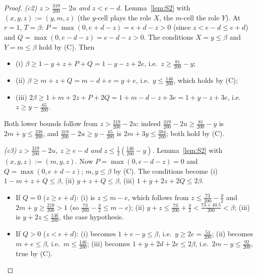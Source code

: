 \documentclass[11pt]{amsart}
\theoremstyle{definition}
\theoremstyle{remark}
\begin{document}
\begin{proof}
\emph{(c2) $z>\tfrac{319}{200}-2u$ and $z<e-d$.} Lemma~\ref{lem:S2} with $(x,y,z):=(y,m,z)$ (the $y$-cell plays the role $X$, the $m$-cell the role $Y$). At $r=1$, $T=\beta$: $P=\max(0,e+d-z)=e+d-z>0$ (since $z<e-d\le e+d$) and $Q=\max(0,e-d-z)=e-d-z>0$. The conditions $X=y\le\beta$ and $Y=m\le\beta$ hold by (C). Then
\begin{itemize}
\item (i) $\beta\ge1-y+z+P+Q=1-y-z+2e$, i.e.\ $z\ge\tfrac{81}{200}-y$;
\item (ii) $\beta\ge m+z+Q=m-d+e=y+e$, i.e.\ $y\le\tfrac{146}{200}$, which holds by (C);
\item (iii) $2\beta\ge1+m+2z+P+2Q=1+m-d-z+3e=1+y-z+3e$, i.e.\ $z\ge y-\tfrac{65}{200}$.
\end{itemize}
Both lower bounds follow from $z>\tfrac{319}{200}-2u$: indeed $\tfrac{319}{200}-2u\ge\tfrac{81}{200}-y$ is $2m+y\le\tfrac{238}{200}$, and $\tfrac{319}{200}-2u\ge y-\tfrac{65}{200}$ is $2m+3y\le\tfrac{384}{200}$; both hold by (C).

\emph{(c3) $z>\tfrac{319}{200}-2u$, $z\ge e-d$ and $z\le\tfrac12(\tfrac{146}{200}-y)$.} Lemma~\ref{lem:S2} with $(x,y,z):=(m,y,z)$. Now $P=\max(0,e-d-z)=0$ and $Q=\max(0,e+d-z)$; $m,y\le\beta$ by (C). The conditions become (i) $1-m+z+Q\le\beta$, (ii) $y+z+Q\le\beta$, (iii) $1+y+2z+2Q\le2\beta$.
\begin{itemize}
\item If $Q=0$ ($z\ge e+d$): (i) is $z\le m-e$, which follows from $z\le\tfrac{73}{200}-\tfrac y2$ and $2m+y\ge\tfrac{219}{200}>1$ (so $\tfrac{73}{200}-\tfrac y2\le m-e$); (ii) $y+z\le\tfrac{73}{200}+\tfrac y2<\tfrac{73+40.5}{200}<\beta$; (iii) is $y+2z\le\tfrac{146}{200}$, the case hypothesis.
\item If $Q>0$ ($z<e+d$): (i) becomes $1+e-y\le\beta$, i.e.\ $y\ge2e=\tfrac{54}{200}$; (ii) becomes $m+e\le\beta$, i.e.\ $m\le\tfrac{146}{200}$; (iii) becomes $1+y+2d+2e\le2\beta$, i.e.\ $2m-y\le\tfrac{92}{200}$, true by (C).
\end{itemize}


\end{proof}
\end{document}
